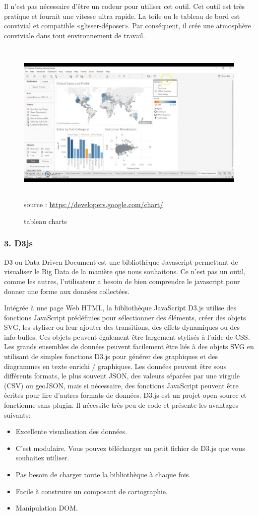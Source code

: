 \documentclass[french, a4paper, 12pt]{report}
\begin{document}
Il n’est pas nécessaire d’être un codeur pour utiliser cet outil. Cet outil est très pratique et fournit une vitesse ultra rapide. La toile ou le tableau de bord est convivial et compatible «glisser-déposer». Par conséquent, il crée une atmosphère conviviale dans tout environnement de travail.
\begin{figure}[!htp]
    \centering
    \includegraphics[height=8cm]{images/tableau.jpg}
    \scriptsize{source : \url{https://developers.google.com/chart/}}
    \caption{tableau charts}
    \label{fig:2.16}
\end{figure}
\subsubsection{3. D3js}
D3 ou Data Driven Document est une bibliothèque Javascript permettant de visualiser le Big Data de la manière que nous souhaitons. Ce n'est pas un outil, comme les autres, l'utilisateur a besoin de bien comprendre le javascript pour donner une forme aux données collectées. 

Intégrée à une page Web HTML, la bibliothèque JavaScript D3.js utilise des fonctions JavaScript prédéfinies pour sélectionner des éléments, créer des objets SVG, les styliser ou leur ajouter des transitions, des effets dynamiques ou des info-bulles. Ces objets peuvent également être largement stylisés à l'aide de CSS. Les grands ensembles de données peuvent facilement être liés à des objets SVG en utilisant de simples fonctions D3.js pour générer des graphiques et des diagrammes en texte enrichi / graphiques. Les données peuvent être sous différents formats, le plus souvent JSON, des valeurs séparées par une virgule (CSV) ou geoJSON, mais si nécessaire, des fonctions JavaScript peuvent être écrites pour lire d'autres formats de données.
D3.js est un projet open source et fonctionne sans plugin. Il nécessite très peu de code et présente les avantages suivants:
\begin{itemize}
    \item Excellente visualisation des données.
    \item C'est modulaire. Vous pouvez télécharger un petit fichier de D3.js que vous souhaitez utiliser.
    \item Pas besoin de charger toute la bibliothèque à chaque fois.
    \item Facile à construire un composant de cartographie.
    \item Manipulation DOM.
\end{itemize}
\end{document}

